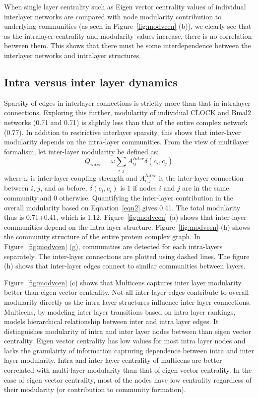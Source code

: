 \documentclass[10pt,letterpaper]{article}
\begin{document}
When single layer centrality such as Eigen vector centrality values of individual interlayer networks are compared with node modularity contribution to underlying communities (as seen in Figure~\ref{fig:modvcen} (b)), we clearly see that as the intralayer centrality and modularity values increase, there is no correlation between them. This shows that there must be some interdependence between the interlayer networks and intralayer structures. 

\subsection*{Intra versus inter layer dynamics}
Sparsity of edges in interlayer connections is strictly more than that in intralayer connections. Exploring this further, modularity of individual CLOCK and Bmal2 networks (0.71 and 0.71) is slightly less than that of the entire complex network (0.77). In addition to restrictive interlayer sparsity, this shows that inter-layer modularity depends on the intra-layer communities. From the view of multilayer formalism, let inter-layer modularity be defined as:
\begin{equation}
\label{eqn2}
Q_{inter} = \omega \sum_{i, j} A_{ij}^{Inter} \delta(c_{i},c_{j})
\end{equation}
where $\omega$ is inter-layer coupling strength and $A_{i,j}^{Inter}$ is the inter-layer connection between $i$, $j$, and as before, $\delta(c_i, c_i)$ is 1 if nodes $i$ and $j$ are in the same community and 0 otherwise. 
Quantifying the inter-layer contribution in the overall modularity based on Equation~\ref{eqn2} gives 0.41. The total modularity thus is 0.71+0.41, which is 1.12. Figure~\ref{fig:modvcen} (a) shows that inter-layer communities depend on the intra-layer structure. Figure~\ref{fig:modvcen} (h) shows the community structure of the entire protein complex graph. In Figure~\ref{fig:modvcen} (g), communities are detected for each intra-layers separately. The inter-layer connections are plotted using dashed lines. The figure (h) shows that inter-layer edges connect to similar communities between layers. 

Figure~\ref{fig:modvcen} (c) shows that Multicens captures inter layer modularity better than eigen-vector centrality. Not all inter layer edges contribute to overall modularity directly as the intra layer structures influence inter layer connections. Multicens, by modeling inter layer transitions based on intra layer rankings, models hierarchical relationship between inter and intra layer edges. It distinguishes modularity of intra and inter layer nodes between than eigen vector centrality. Eigen vector centrality has low values for most intra layer nodes and lacks the granulairty of information capturing dependence between intra and inter layer modularity. Intra and inter layer centrality of multicens are better correlated with multi-layer modularity than that of eigen vector centrality. In the case of eigen vector centrality, most of the nodes have low centrality regardless of their modularity (or contribution to community formation). 
\end{document}
